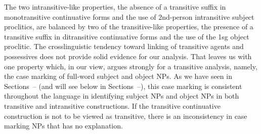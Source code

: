\documentclass[output=paper,colorlinks,citecolor=brown]{langscibook}
\begin{document}
The two intransitive-like properties, the absence of a transitive
suffix in monotransitive continuative forms and the use of 2nd-person
intransitive subject proclitics, are balanced by two of the
transitive-like properties, the presence of a transitive suffix in
ditransitive continuative forms and the use of the 1sg object
proclitic.  The crosslinguistic tendency toward linking of transitive
agents and possessives does not provide solid evidence for our
analysis.  That leaves us with one property which, in our view, argues
strongly for a transitive analysis, namely, the case marking of
full-word subject and object NPs.  As we have seen in Sections~-- (and
will see below in Sections~--), this case marking is consistent
throughout the language in identifying subject NPs and object NPs in
both transitive and intransitive constructions.  If the transitive
continuative construction is not to be viewed as transitive, there is
an inconsistency in case marking NPs that has no explanation.
\end{document}
